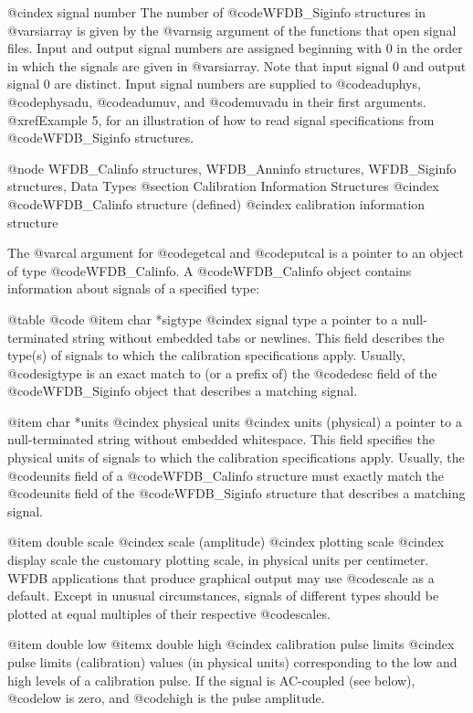 {{{{{{{{{@cindex signal number
The number of @code{WFDB_Siginfo} structures in @var{siarray} is given by
the @var{nsig} argument of the functions that open signal files.  Input
and output signal numbers are assigned beginning with 0 in the order in
which the signals are given in @var{siarray}.  Note that input signal 0
and output signal 0 are distinct.  Input signal numbers are supplied to
@code{aduphys}, @code{physadu}, @code{adumuv}, and @code{muvadu} in
their first arguments.  @xref{Example 5}, for an illustration of how to
read signal specifications from @code{WFDB_Siginfo} structures.

@node WFDB_Calinfo structures, WFDB_Anninfo structures, WFDB_Siginfo structures, Data Types
@section Calibration Information Structures
@cindex @code{WFDB_Calinfo} structure (defined)
@cindex calibration information structure

The @var{cal} argument for @code{getcal} and @code{putcal} is a pointer
to an object of type @code{WFDB_Calinfo}.  A @code{WFDB_Calinfo} object
contains information about signals of a specified type:

@table @code
@item char *sigtype
@cindex signal type
a pointer to a null-terminated string without embedded tabs or newlines.
This field describes the type(s) of signals to which the calibration
specifications apply.  Usually, @code{sigtype} is an exact match to
(or a prefix of) the @code{desc} field of the @code{WFDB_Siginfo} object
that describes a matching signal.

@item char *units
@cindex physical units
@cindex units (physical)
a pointer to a null-terminated string without embedded whitespace.
This field specifies the physical units of signals to which the
calibration specifications apply.  Usually, the @code{units} field of
a @code{WFDB_Calinfo} structure must exactly match the @code{units} field of
the @code{WFDB_Siginfo} structure that describes a matching signal.

@item double scale
@cindex scale (amplitude)
@cindex plotting scale
@cindex display scale
the customary plotting scale, in physical units per centimeter.  WFDB
applications that produce graphical output may use @code{scale} as a
default.  Except in unusual circumstances, signals of different types
should be plotted at equal multiples of their respective @code{scale}s.

@item double low
@itemx double high
@cindex calibration pulse limits
@cindex pulse limits (calibration)
values (in physical units) corresponding to the low and high levels of
a calibration pulse.  If the signal is AC-coupled (see below),
@code{low} is zero, and @code{high} is the pulse amplitude.

}}}}}}}}}
